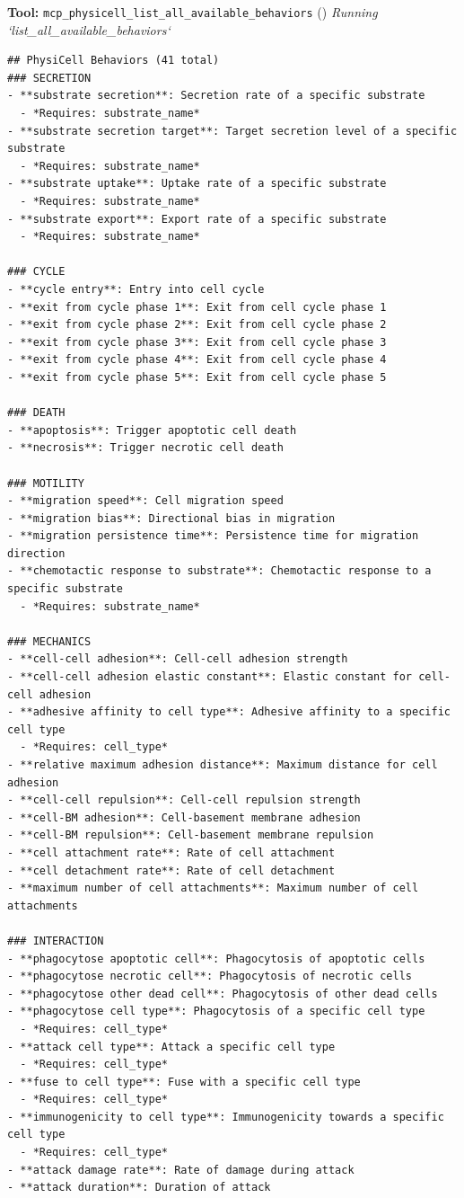 \documentclass[11pt,a4paper]{article}
\begin{document}
\begin{toolokbox}
\textbf{Tool:} \texttt{mcp\_physicell\_list\_all\_available\_behaviors} (\checkmark)
\textit{Running `list\_all\_available\_behaviors`}
\begin{lstlisting}
## PhysiCell Behaviors (41 total)
### SECRETION
- **substrate secretion**: Secretion rate of a specific substrate
  - *Requires: substrate_name*
- **substrate secretion target**: Target secretion level of a specific substrate
  - *Requires: substrate_name*
- **substrate uptake**: Uptake rate of a specific substrate
  - *Requires: substrate_name*
- **substrate export**: Export rate of a specific substrate
  - *Requires: substrate_name*

### CYCLE
- **cycle entry**: Entry into cell cycle
- **exit from cycle phase 1**: Exit from cell cycle phase 1
- **exit from cycle phase 2**: Exit from cell cycle phase 2
- **exit from cycle phase 3**: Exit from cell cycle phase 3
- **exit from cycle phase 4**: Exit from cell cycle phase 4
- **exit from cycle phase 5**: Exit from cell cycle phase 5

### DEATH
- **apoptosis**: Trigger apoptotic cell death
- **necrosis**: Trigger necrotic cell death

### MOTILITY
- **migration speed**: Cell migration speed
- **migration bias**: Directional bias in migration
- **migration persistence time**: Persistence time for migration direction
- **chemotactic response to substrate**: Chemotactic response to a specific substrate
  - *Requires: substrate_name*

### MECHANICS
- **cell-cell adhesion**: Cell-cell adhesion strength
- **cell-cell adhesion elastic constant**: Elastic constant for cell-cell adhesion
- **adhesive affinity to cell type**: Adhesive affinity to a specific cell type
  - *Requires: cell_type*
- **relative maximum adhesion distance**: Maximum distance for cell adhesion
- **cell-cell repulsion**: Cell-cell repulsion strength
- **cell-BM adhesion**: Cell-basement membrane adhesion
- **cell-BM repulsion**: Cell-basement membrane repulsion
- **cell attachment rate**: Rate of cell attachment
- **cell detachment rate**: Rate of cell detachment
- **maximum number of cell attachments**: Maximum number of cell attachments

### INTERACTION
- **phagocytose apoptotic cell**: Phagocytosis of apoptotic cells
- **phagocytose necrotic cell**: Phagocytosis of necrotic cells
- **phagocytose other dead cell**: Phagocytosis of other dead cells
- **phagocytose cell type**: Phagocytosis of a specific cell type
  - *Requires: cell_type*
- **attack cell type**: Attack a specific cell type
  - *Requires: cell_type*
- **fuse to cell type**: Fuse with a specific cell type
  - *Requires: cell_type*
- **immunogenicity to cell type**: Immunogenicity towards a specific cell type
  - *Requires: cell_type*
- **attack damage rate**: Rate of damage during attack
- **attack duration**: Duration of attack


\end{lstlisting}
\end{toolokbox}
\end{document}
